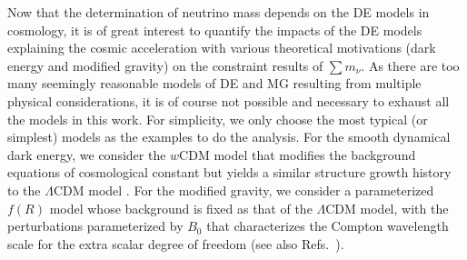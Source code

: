 \documentclass[aps,prd,nofootinbib,amsmath,amssymb,twocolumn,superscriptaddress,10pt]{revtex4}%
\def\msum{$\sum m_\nu$}
\begin{document}
{Now that the determination of neutrino mass depends on the DE models in cosmology, it is of great interest to quantify the impacts of the DE models explaining the cosmic acceleration with various theoretical motivations (dark energy and modified gravity) on the constraint results of \msum. As there are too many seemingly reasonable models of DE and MG resulting from multiple physical considerations, it is of course not possible and necessary to exhaust all the models in this work. For simplicity, we only choose the most typical (or simplest) models as the examples to do the analysis. For the smooth dynamical dark energy, we consider the $w$CDM model that modifies the background equations of cosmological constant but yields a similar structure growth history to the $\Lambda$CDM model \cite{Linder:2005in}. For the modified gravity, we consider a parameterized $f(R)$ model whose background is fixed as that of the $\Lambda$CDM model, with the perturbations parameterized by $B_0$ that characterizes the Compton wavelength scale for the extra scalar degree of freedom} \cite{Song:2006ej} (see also Refs.~\cite{Bertschinger:2008zb,Giannantonio:2009gi,Li:2015fR}). 
\end{document}
